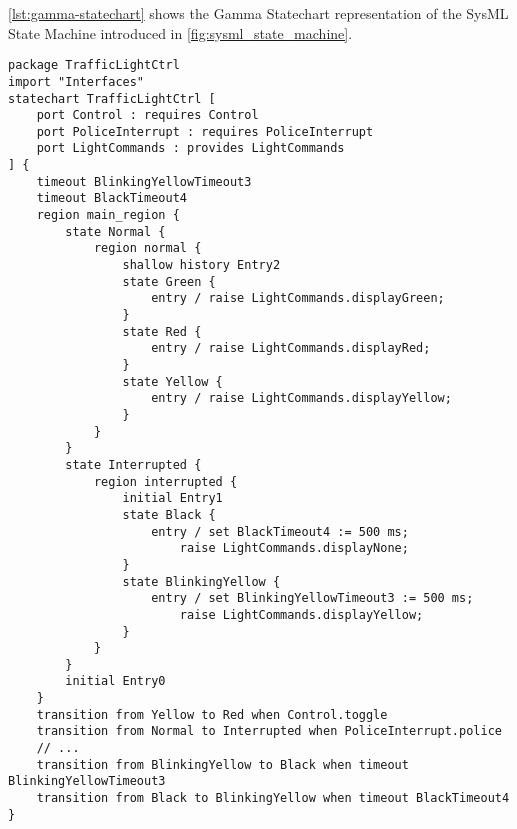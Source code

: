 \autoref{lst:gamma-statechart} shows the Gamma Statechart representation of the SysML State Machine introduced in \autoref{fig:sysml_state_machine}.

\begin{lstlisting}[float,language=statechart, caption={The traffic light controller state machine in the textual representation of Gamma's statechart language.}, label={lst:gamma-statechart}]
package TrafficLightCtrl
import "Interfaces"
statechart TrafficLightCtrl [
	port Control : requires Control
	port PoliceInterrupt : requires PoliceInterrupt
	port LightCommands : provides LightCommands
] {
	timeout BlinkingYellowTimeout3
	timeout BlackTimeout4
	region main_region {
		state Normal {
			region normal {
				shallow history Entry2
				state Green {
					entry / raise LightCommands.displayGreen;
				}
				state Red {
					entry / raise LightCommands.displayRed;
				}
				state Yellow {
					entry / raise LightCommands.displayYellow;
				}
			}
		}
		state Interrupted {
			region interrupted {
				initial Entry1
				state Black {
					entry / set BlackTimeout4 := 500 ms; 
						raise LightCommands.displayNone;
				}
				state BlinkingYellow {
					entry / set BlinkingYellowTimeout3 := 500 ms; 
						raise LightCommands.displayYellow;
				}
			}
		}
		initial Entry0
	}
	transition from Yellow to Red when Control.toggle
	transition from Normal to Interrupted when PoliceInterrupt.police
	// ...
	transition from BlinkingYellow to Black when timeout BlinkingYellowTimeout3
	transition from Black to BlinkingYellow when timeout BlackTimeout4
}
\end{lstlisting}